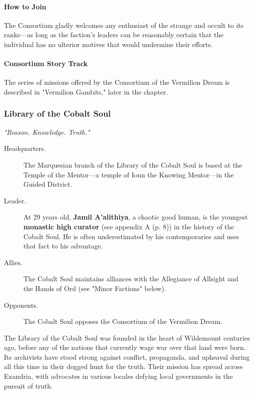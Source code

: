 \documentclass[a4paper, 11pt, bg=full, twocolumn, nooutline]{dndbook}
\begin{document}
\paragraph{How to Join}

The Consortium gladly welcomes any enthusiast of the strange and occult to its ranks---as long as the faction's leaders can be reasonably certain that the individual has no ulterior motives that would undermine their efforts.

\paragraph{Consortium Story Track}

The series of missions offered by the Consortium of the Vermilion Dream is described in "Vermilion Gambits," later in the chapter.

\subsubsection{Library of the Cobalt Soul}

\textit{"Reason. Knowledge. Truth."}

\begin{description}
\item[Headquarters.] The Marquesian branch of the Library of the Cobalt Soul is based at the Temple of the Mentor---a temple of Ioun the Knowing Mentor---in the Guided District.
\end{description}


\begin{description}
\item[Leader.] At 29 years old, \textbf{Jamil A'alithiya}, a chaotic good human, is the youngest \textbf{monastic high curator} (see appendix A (p. 8)) in the history of the Cobalt Soul. He is often underestimated by his contemporaries and uses that fact to his advantage.
\item[Allies.] The Cobalt Soul maintains alliances with the Allegiance of Allsight and the Hands of Ord (see "Minor Factions" below).
\item[Opponents.] The Cobalt Soul opposes the Consortium of the Vermilion Dream.
\end{description}

The Library of the Cobalt Soul was founded in the heart of Wildemount centuries ago, before any of the nations that currently wage war over that land were born. Its archivists have stood strong against conflict, propaganda, and upheaval during all this time in their dogged hunt for the truth. Their mission has spread across Exandria, with advocates in various locales defying local governments in the pursuit of truth.
\end{document}
